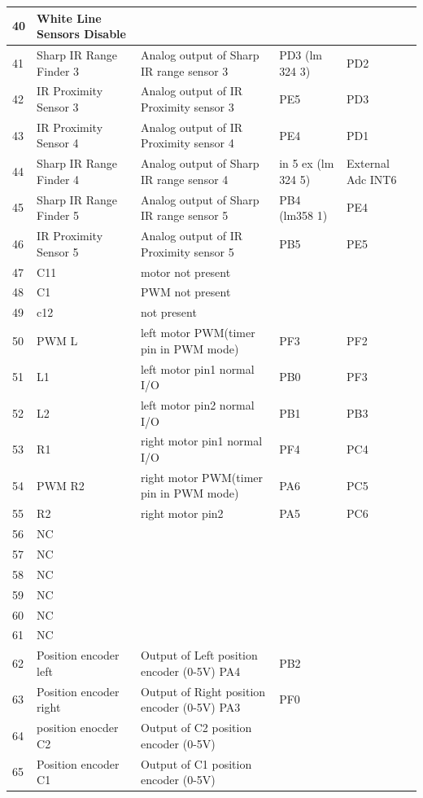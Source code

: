 \documentclass[a4paper,10pt,oneside]{article}
\begin{document}
{\begin{longtable}{|p{}|p{}|p{}|p{}|p{}|}
				40&	White Line Sensors Disable&& &\\ \hline		
				41&	Sharp IR Range Finder 3&	Analog output of Sharp IR range sensor 3	&PD3 (lm 324 3) & PD2\\ \hline
				42&	IR Proximity Sensor 3&	Analog output of IR Proximity sensor 3	&PE5 & PD3\\ \hline
				43&	IR Proximity Sensor 4&	Analog output of IR Proximity sensor 4&	PE4 & PD1\\ \hline
				44&	Sharp IR Range Finder 4	&Analog output of Sharp IR range sensor 4&	in 5 ex (lm 324 5) &	External Adc INT6\\ \hline
				45&	Sharp IR Range Finder 5&	Analog output of Sharp IR range sensor 5&	PB4 (lm358 1) & PE4\\ \hline
				46&	IR Proximity Sensor 5&	Analog output of IR Proximity sensor 5&	PB5 & PE5\\ \hline
				47&	C11& motor 	not present& &	\\ \hline
				48&	C1 &PWM	not present	& &\\ \hline
				49&	c12&	not present	& &\\ \hline
				50&	PWM L&	left motor PWM(timer pin in PWM mode)&	PF3 & PF2\\ \hline
				51&	L1&	left motor pin1 normal I/O&	PB0 & PF3\\ \hline
				52&	L2&	left motor pin2 normal I/O&	PB1 & PB3\\ \hline
				53&	R1&	right motor pin1 normal I/O&	PF4 & PC4\\ \hline
				54&	PWM R2&	right motor PWM(timer pin in PWM  mode)&	PA6 & PC5\\ \hline
				55&	R2&	right motor pin2&	PA5 & PC6\\ \hline
				56&	NC&&&	\\ \hline	
				57&	NC&&&	\\ \hline	
				58&	NC&&&	\\ \hline	
				59&	NC&&&	\\ \hline	
				60&	NC&&&	\\ \hline	
				61&	NC&&&	\\ \hline
				62&	Position encoder left&	Output of Left position encoder (0-5V)	PA4&PB2&\\ \hline
				63&	Position encoder right& 	Output of Right position encoder (0-5V)	PA3&PF0&\\ \hline
				64&	position enocder C2&	Output of C2 position encoder (0-5V)&&	\\ \hline
				65&	Position encoder C1& Output of C1 position encoder (0-5V)&&	\\ \hline

\end{longtable}}
\end{document}

